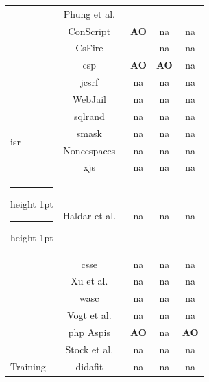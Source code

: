 \documentclass[conference]{IEEEtran}
\makeatletter
\newcommand{\tick}{\ding{52}}
\newcommand{\thickhline}{%
    \noalign {\ifnum 0=`}\fi \hrule height 1pt
    \futurelet \reserved@a \@xhline
}
\makeatother
\begin{document}
\begin{table}
\begin{threeparttable}
\begin{small}
{\begin{tabular}{l|c|ccc}
  &   Phung et al.~\cite{PSC09} & \tick & \tick & \tick \\
  &   ConScript~\cite{ML10} & {\bf AO} & {\sc na} & {\sc na} \\
  &   CsFire~\cite{DDHPJ10} & \tick & {\sc na} & {\sc na} \\
  &   {\sc csp}~\cite{SSM10} & {\bf AO} & {\bf AO} & {\sc na} \\
  &   j{\sc csrf}~\cite{PS11} & {\sc na} & {\sc na} & {\sc na} \\
  &   WebJail~\cite{VDDPJ11} & {\sc na} & {\sc na} & {\sc na} \\
  \hline
  \multirow{4}{*}{{\sc isr}}
  &   {\sc sql}rand~\cite{BK04} & {\sc na} & {\sc na} & {\sc na} \\
  &   {\sc sm}ask~\cite{JB07} & {\sc na} & {\sc na} & {\sc na} \\
  &   Noncespaces~\cite{GC09} & {\sc na} & {\sc na} & {\sc na} \\
  &   x{\sc js}~\cite{APKLM10} & {\sc na} & {\sc na} & {\sc na} \\
  \thickhline
  \thickhline
  \multirow{7}{*}{Taint Tracking}
  &   Haldar et al.~\cite{HCF05}  & {\sc na} & {\sc na} & {\sc na} \\
  &   {\sc csse}~\cite{PB05} & {\sc na} & {\sc na} & {\sc na} \\
  &   Xu et al.~\cite{XBS06}  & {\sc na} & {\sc na} & {\sc na} \\
  &   {\sc wasc}~\cite{NLC07} & {\sc na} & {\sc na} & {\sc na} \\
  &   Vogt et al.~\cite{VFJKKV07}  & {\sc na} & {\sc na} & {\sc na} \\
  &   {\sc php} Aspis~\cite{PMP11} & {\bf AO} & {\sc na} & {\bf AO} \\
  &   Stock et al.~\cite{SLMS14} & {\sc na} & {\sc na} & {\sc na} \\
  \hline
  \multirow{6}{*}{Training}
  &   {\sc didafit}~\cite{LLW02} & {\sc na} & {\sc na} & {\sc na} \\

\end{tabular}}
\end{small}
\end{threeparttable}
\end{table}
\end{document}
